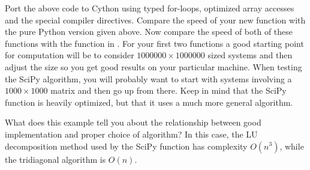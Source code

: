 \begin{problem}
Port the above code to Cython using typed for-loops, optimized array accesses and the special compiler directives.
Compare the speed of your new function with the pure Python version given above.
Now compare the speed of both of these functions with the  function in .
For your first two functions a good starting point for computation will be to consider $1000000 \times 1000000$ sized systems and then adjust the size so you get good results on your particular machine.
When testing the SciPy algorithm, you will probably want to start with systems involving a $1000 \times 1000$ matrix and then go up from there.
Keep in mind that the SciPy function is heavily optimized, but that it uses a much more general algorithm.

What does this example tell you about the relationship between good implementation and proper choice of algorithm?
In this case, the LU decomposition method used by the SciPy function has complexity $O(n^3)$, while the tridiagonal algorithm is $O(n)$.
\end{problem}
